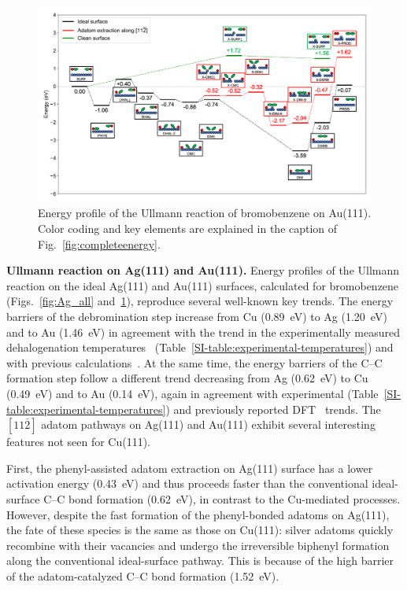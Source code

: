 \documentclass[aps,prb,amsmath,amssymb,11pt]{revtex4-1}
\begin{document}
\begin{figure}[bt]
\centering
\includegraphics[width=1.\textwidth]{Fig/Au_mainfile.png}
\caption{Energy profile of the Ullmann reaction of bromobenzene on Au(111). Color coding and key elements are explained in the caption of Fig.~\ref{fig:completeenergy}.}
\label{fig:Au_all}
\end{figure}


\textbf{Ullmann reaction on Ag(111) and Au(111).}
%
Energy profiles of the Ullmann reaction on the ideal Ag(111) and Au(111) surfaces, calculated for bromobenzene (Figs.~\ref{fig:Ag_all} and~\ref{fig:Au_all}), reproduce several well-known key trends.  
The energy barriers of the debromination step increase from Cu (\SI{0.89}{\electronvolt}) to Ag (\SI{1.20}{\electronvolt}) and to Au (\SI{1.46}{\electronvolt}) in agreement with the trend in the experimentally measured dehalogenation temperatures~\cite{ullmann_52,ullmann_87,ullmann_67} (Table~\ref{SI-table:experimental-temperatures}) and with previous calculations~\cite{jacs2013}.
At the same time, the energy barriers of the C--C formation step follow a different trend decreasing from Ag (\SI{0.62}{\electronvolt}) to Cu (\SI{0.49}{\electronvolt}) and to Au (\SI{0.14}{\electronvolt}), again in agreement with experimental (Table~\ref{SI-table:experimental-temperatures}) and previously reported DFT~\cite{jacs2013} trends. The $[11\bar{2}]$ adatom pathways on Ag(111) and Au(111) exhibit several interesting features not seen for Cu(111).

First, the phenyl-assisted adatom extraction on Ag(111) surface has a lower activation energy (\SI{0.43}{\electronvolt}) and thus proceeds faster than the conventional ideal-surface C--C bond formation (\SI{0.62}{\electronvolt}), in contrast to the Cu-mediated processes. However, despite the fast formation of the phenyl-bonded adatoms on Ag(111), the fate of these species is the same as those on Cu(111): silver adatoms quickly recombine with their vacancies and undergo the irreversible biphenyl formation along the conventional ideal-surface pathway. This is because of the high barrier of the adatom-catalyzed C--C bond formation (\SI{1.52}{\electronvolt}).
\end{document}

